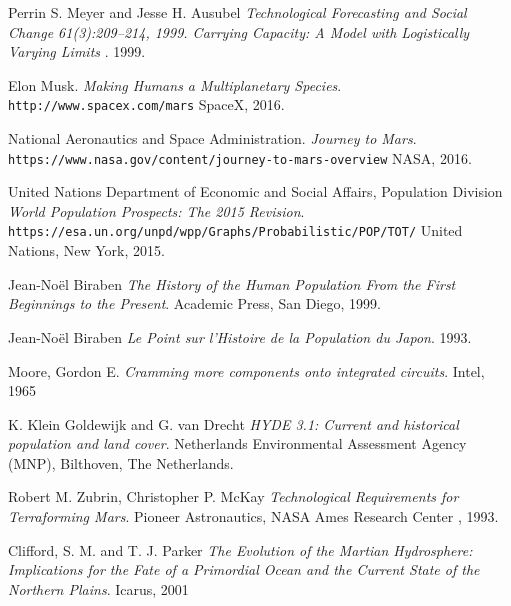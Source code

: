 \documentclass[12pt]{article}
\begin{document}
\begin{thebibliography}{9}
Perrin S. Meyer and Jesse H. Ausubel 
\textit{Technological Forecasting and Social Change 61(3):209–214, 1999. Carrying Capacity: A Model with Logistically Varying Limits }. 
 1999.
 
Elon Musk. 
\textit{Making Humans a Multiplanetary Species}.
\\\texttt{http://www.spacex.com/mars}
SpaceX, 2016.


National Aeronautics and Space Administration. 
\textit{Journey to Mars}.
\\\texttt{https://www.nasa.gov/content/journey-to-mars-overview}
NASA, 2016.


United Nations Department of Economic and Social Affairs, Population Division
\textit{World Population Prospects: The 2015 Revision}.
\\\texttt{https://esa.un.org/unpd/wpp/Graphs/Probabilistic/POP/TOT/}
United Nations, New York, 2015.


Jean-Noël Biraben
\textit{The History of the Human Population From the First Beginnings to the Present}.
 Academic Press, San Diego, 1999.


Jean-Noël Biraben
\textit{Le Point sur l'Histoire de la Population du Japon}.
1993.


Moore, Gordon E.
\textit{Cramming more components onto integrated circuits}.
Intel, 1965


K. Klein Goldewijk and G. van Drecht
\textit{HYDE 3.1: Current and historical population and land cover}.
Netherlands Environmental Assessment Agency (MNP), Bilthoven, The Netherlands.


Robert M. Zubrin, Christopher P. McKay
\textit{Technological Requirements for Terraforming Mars}.
Pioneer Astronautics, NASA Ames Research Center , 1993.


Clifford, S. M. and T. J. Parker
\textit{The Evolution of the Martian Hydrosphere: Implications for the Fate of a Primordial Ocean and the Current State of the Northern Plains}.
Icarus, 2001
\end{thebibliography}
\end{document}
